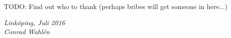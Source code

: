 \begin{acknowledgments}
  TODO: Find out who to thank (perhaps bribes will get someone in here...)

  \addvspace{1em}
  \begin{flushright}
    \textit{%
      Linköping, Juli 2016\\
      Conrad Wahlén
    }
  \end{flushright}
\end{acknowledgments}
